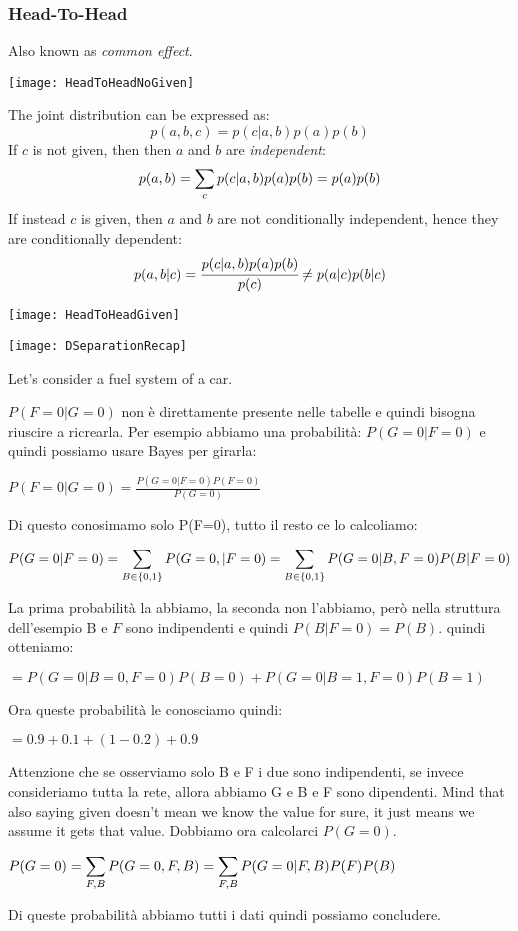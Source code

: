 \subsubsection{Head-To-Head}
Also known as \textit{common effect}.
\begin{center}
	\texttt{[image: HeadToHeadNoGiven]}  
\end{center}
The joint distribution can be expressed as:
\[
  p(a,b,c)=p(c\vert a, b)p(a)p(b)
\]
If $c$ is not given, then then $a$ and $b$ are \textit{independent}:
\[
  p(a,b)=\displaystyle\sum_cp(c\vert a, b)p(a)p(b)=p(a)p(b)
\]
If instead $c$ is given, then $a$ and $b$ are not conditionally independent, hence they are conditionally dependent:
\[
p(a,b\vert c)=\cfrac{p(c\vert a,b)p(a)p(b)}{p(c)}\neq p(a\vert c)p(b\vert c)
\]
\begin{center}
  \texttt{[image: HeadToHeadGiven]}
\end{center}
\begin{center}
  \texttt{[image: DSeparationRecap]}
\end{center}
Let's consider a fuel system of a car.


$P(F=0\vert G=0)$ non è direttamente presente nelle tabelle e quindi bisogna riuscire a ricrearla.\newline
Per esempio abbiamo una probabilità: $P(G=0\vert F=0)$ e quindi possiamo usare Bayes per girarla:
\begin{center}
	$\displaystyle P(F=0\vert G=0)=\frac{P(G=0\vert F=0)P(F=0)}{P(G=0)}$
\end{center}
Di questo conosimamo solo P(F=0), tutto il resto ce lo calcoliamo:
\begin{center}
	$\displaystyle P(G=0\vert F=0)= \displaystyle\sum_{B \in \{0,1\}} P(G=0, \vert F=0) =
					\displaystyle\sum_{B \in\{0,1\}}P(G=0\vert B,F=0)P(B\vert F=0)$
\end{center}
La prima probabilità la abbiamo, la seconda non l'abbiamo, però nella struttura dell'esempio B e $F$ sono indipendenti e quindi $P(B\vert F=0)=P(B)$. quindi otteniamo:
\begin{center}
	$\displaystyle =P(G=0\vert B=0, F=0)P(B=0)+P(G=0\vert B=1, F=0)P(B=1)$
\end{center}
Ora queste probabilità le conosciamo quindi:
\begin{center}
	$\displaystyle =0.9+0.1+(1-0.2)+0.9$
\end{center}
Attenzione che se osserviamo solo B e F i due sono indipendenti, se invece consideriamo tutta la rete, allora abbiamo G e B e F sono dipendenti. Mind that also saying given doesn't mean we know the value for sure, it just means we assume it gets that value. \newline
Dobbiamo ora calcolarci $P(G=0)$. 
\begin{center}
	$\displaystyle P(G=0)=\displaystyle\sum_{F,B}P(G=0, F, B)=\displaystyle\sum_{F,B}P(G=0\vert F, B)P(F)P(B)$
\end{center}
Di queste probabilità abbiamo tutti i dati quindi possiamo concludere.\newline
